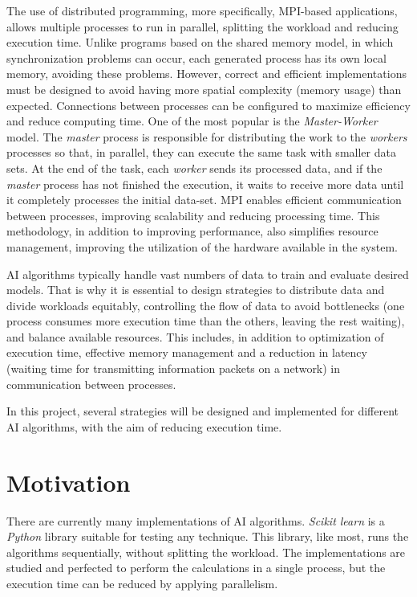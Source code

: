 The use of distributed programming, more specifically, MPI-based applications, allows multiple processes to run in parallel, splitting the workload and reducing execution time. Unlike programs based on the shared memory model, in which synchronization problems can occur, each generated process has its own local memory, avoiding these problems. However, correct and efficient implementations must be designed to avoid having more spatial complexity (memory usage) than expected. Connections between processes can be configured to maximize efficiency and reduce computing time. One of the most popular is the \textit{Master-Worker} model. The \textit{master} process is responsible for distributing the work to the \textit{workers} processes so that, in parallel, they can execute the same task with smaller data sets. At the end of the task, each \textit{worker} sends its processed data, and if the \textit{master} process has not finished the execution, it waits to receive more data until it completely processes the initial data-set. MPI enables efficient communication between processes, improving scalability and reducing processing time. This methodology, in addition to improving performance, also simplifies resource management, improving the utilization of the hardware available in the system.


AI algorithms typically handle vast numbers of data to train and evaluate desired models. That is why it is essential to design strategies to distribute data and divide workloads equitably, controlling the flow of data to avoid bottlenecks (one process consumes more execution time than the others, leaving the rest waiting), and balance available resources. This includes, in addition to optimization of execution time, effective memory management and a reduction in latency (waiting time for transmitting information packets on a network) in communication between processes. 

In this project, several strategies will be designed and implemented for different AI algorithms, with the aim of reducing execution time.



\section{Motivation}

There are currently many implementations of AI algorithms. \textit{Scikit learn} is a \textit{Python} library suitable for testing any technique. This library, like most, runs the algorithms sequentially, without splitting the workload. The implementations are studied and perfected to perform the calculations in a single process, but the execution time can be reduced by applying parallelism. 


